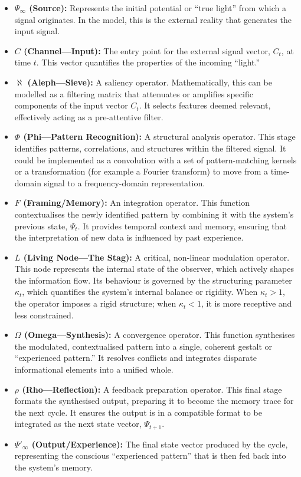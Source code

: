 \documentclass{article}
\begin{document}
\begin{itemize}
    \item \textbf{$\Psi_\infty$ (Source):} Represents the initial potential or ``true light'' from which a signal originates. In the model, this is the external reality that generates the input signal.
    \item \textbf{$C$ (Channel---Input):} The entry point for the external signal vector, $C_t$, at time $t$. This vector quantifies the properties of the incoming ``light.''
    \item \textbf{$\aleph$ (Aleph---Sieve):} A saliency operator. Mathematically, this can be modelled as a filtering matrix that attenuates or amplifies specific components of the input vector $C_t$. It selects features deemed relevant, effectively acting as a pre-attentive filter.
    \item \textbf{$\Phi$ (Phi---Pattern Recognition):} A structural analysis operator. This stage identifies patterns, correlations, and structures within the filtered signal. It could be implemented as a convolution with a set of pattern-matching kernels or a transformation (for example a Fourier transform) to move from a time-domain signal to a frequency-domain representation.
    \item \textbf{$F$ (Framing/Memory):} An integration operator. This function contextualises the newly identified pattern by combining it with the system's previous state, $\Psi_t$. It provides temporal context and memory, ensuring that the interpretation of new data is influenced by past experience.
    \item \textbf{$L$ (Living Node---The Stag):} A critical, non-linear modulation operator. This node represents the internal state of the observer, which actively shapes the information flow. Its behaviour is governed by the structuring parameter $\kappa_t$, which quantifies the system's internal balance or rigidity. When $\kappa_t>1$, the operator imposes a rigid structure; when $\kappa_t<1$, it is more receptive and less constrained.
    \item \textbf{$\Omega$ (Omega---Synthesis):} A convergence operator. This function synthesises the modulated, contextualised pattern into a single, coherent gestalt or ``experienced pattern.'' It resolves conflicts and integrates disparate informational elements into a unified whole.
    \item \textbf{$\rho$ (Rho---Reflection):} A feedback preparation operator. This final stage formats the synthesised output, preparing it to become the memory trace for the next cycle. It ensures the output is in a compatible format to be integrated as the next state vector, $\Psi_{t+1}$.
    \item \textbf{$\Psi'_\infty$ (Output/Experience):} The final state vector produced by the cycle, representing the conscious ``experienced pattern'' that is then fed back into the system's memory.
\end{itemize}
\end{document}
